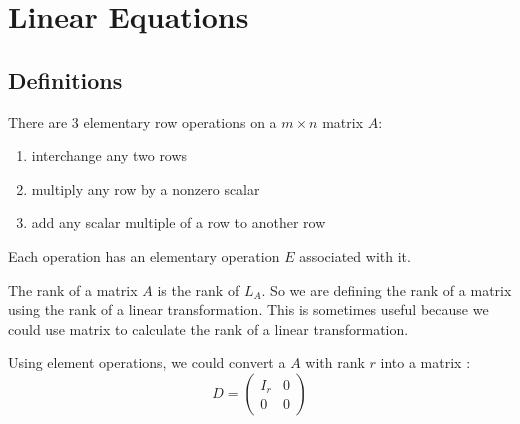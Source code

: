 \section{Linear Equations}

\subsection{Definitions}

There are 3 elementary row operations on a $m \times n$ matrix $A$:
\begin{enumerate}
    \item interchange any two rows
    \item multiply any row by a nonzero scalar
    \item add any scalar multiple of a row to another row
\end{enumerate}

Each operation has an elementary operation $E$ associated with it.


The rank of a matrix $A$ is the rank of $L_A$. So we are defining the rank of a matrix using the rank of a linear transformation. This is sometimes useful because we could use matrix to calculate the rank of a linear transformation.

Using element operations, we could convert a $A$ with rank $r$ into a matrix :
\begin{equation*}
    D = \begin{pmatrix}
        I_r & 0 \\
        0 & 0
    \end{pmatrix}
\end{equation*}
















































